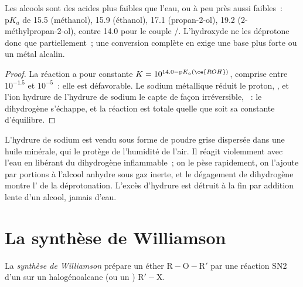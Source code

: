 \begin{proposition}\label{prop:b1:alcohol-activation:alcohol-acidity}
Les alcools sont des acides plus faibles que l'eau, ou à peu près aussi
faibles~: $\mathrm{p}K_a$ de
15.5 (méthanol), 15.9 (éthanol), 17.1 (propan-2-ol), 19.2
(2-méthylpropan-2-ol), contre 14.0 pour le couple /.
L'hydroxyde ne les déprotone donc que partiellement~; une conversion
complète en  exige une base plus forte ou un métal alcalin.
\end{proposition}

\begin{proof}
La réaction  a pour constante $K = 10^{14.0 -
\mathrm{p}K_a(\ce{ROH})}$, comprise entre $10^{-1.5}$ et $10^{-5}$~:
elle est défavorable. Le sodium métallique réduit le proton,
, et l'ion hydrure de l'hydrure de
sodium le capte de façon irréversible,
~: le dihydrogène s'échappe, et la réaction est
totale quelle que soit sa constante d'équilibre.
\end{proof}

\begin{inthelab}
L'hydrure de sodium est vendu sous forme de poudre grise dispersée dans
une huile minérale, qui le protège de l'humidité de l'air. Il réagit
violemment avec l'eau en libérant du dihydrogène inflammable~; on le
pèse rapidement, on l'ajoute par portions à l'alcool anhydre sous gaz
inerte, et le dégagement de dihydrogène montre l' de la
déprotonation. L'excès d'hydrure est détruit à la fin par addition lente
d'un alcool, jamais d'eau.
\end{inthelab}

\section{La synthèse de Williamson}

\begin{definition}\label{def:b1:alcohol-activation:williamson}
La \emph{synthèse de Williamson}
prépare un éther $\mathrm{R{-}O{-}R'}$ par une réaction SN2 d'un
  sur un halogénoalcane (ou un )
$\mathrm{R'{-}X}$.
\end{definition}

